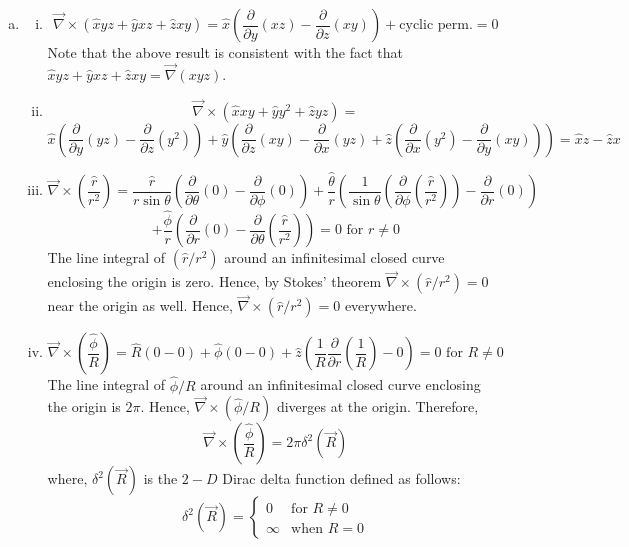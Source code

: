 \documentclass{esg8022pset}
\newcommand{\dx}{\frac{\partial}{\partial x}}
\newcommand{\dy}{\frac{\partial}{\partial y}}
\newcommand{\dz}{\frac{\partial}{\partial z}}
\newcommand{\dtheta}{\frac{\partial}{\partial \theta}}
\newcommand{\dr}{\frac{\partial}{\partial r}}
\begin{document}
\begin{solution}
\begin{enumerate}[(a)]
\begin{enumerate}[(i)]
      \end{enumerate}
    \item
      \begin{enumerate}[(i)]
        \item  $${\vec{\nabla} \times \left( \hat{x} yz + \hat{y} xz + \hat{z} xy \right)} = \hat x\left( \dy\left( xz \right) - \dz(xy) \right) + \text{cyclic perm.} =0 $$
          Note that the above result is consistent with the fact that $\hat{x} yz + \hat{y} xz + \hat{z} xy = \vec{\nabla} (xyz)$.
        \item $$ {\vec{\nabla} \times \left( \hat{x} xy + \hat{y} y^2 + \hat{z} yz \right)} =$$ $$\hat x\left( \dy(yz) - \dz(y^2) \right) + \hat y\left( \dz(xy) - \dx(yz) + \hat z\left( \dx(y^2) - \dy(xy) \right)\right) = \hat x z - \hat z x$$
        \item $${\vec{\nabla} \times \left( \frac{\hat r}{r^2} \right)} = \frac{\hat r}{r \sin \theta} \left( \dtheta \left( 0 \right) - \frac{\partial}{\partial \phi} \left( 0 \right)\right) + \frac{\hat\theta}{r} \left( \frac{1}{\sin \theta} \left( \frac{\partial}{\partial \phi} \left(\frac{\hat r}{r^2} \right) \right)-   \dr \left( 0 \right) \right)$$ $$+  \frac{\hat\phi}{r} \left( \dr \left( 0 \right) - \dtheta \left( \frac{\hat r}{r^2}\right) \right) = 0\text{ for }r \neq 0$$
          The line integral of $\left( \hat r / r^2 \right)$ around an infinitesimal closed curve enclosing the origin is zero. Hence, by Stokes' theorem $\vec{\nabla}\times\left({\hat r/r^2}\right) = 0$ near the origin as well. Hence, ${\vec{\nabla} \times \left( { \hat r / r^2} \right)} = 0$ everywhere.
        \item $${\vec{\nabla} \times \left( \frac{ \hat\phi}{R} \right)} = \hat{R} \left( 0 -0 \right) + \hat\phi \left( 0 - 0\right) + \hat z \left( \frac{1}{R} \dr \left( \frac{1}{R} \right) - 0 \right) = 0\text{ for }R \neq 0 $$
          The line integral  of ${ \hat\phi / R} $ around an infinitesimal closed curve enclosing the origin is $2\pi$. Hence, ${\vec{\nabla} \times \left( { \hat\phi / R} \right)}$ diverges at the origin. Therefore, 
          $${\vec{\nabla} \times \left( \frac{ \hat\phi}{R} \right)} = 2\pi \delta^2(\vec{R}) $$
          where, $\delta^2(\vec{R})$ is the $2-D$ Dirac delta function defined as follows:
          $$ \delta^2(\vec{R}) = \begin{cases} 0 & \text{for }R \neq  0 \\ \infty & \text{when }R = 0 \end{cases}$$

\end{enumerate}
\end{enumerate}
\end{solution}
\end{document}
